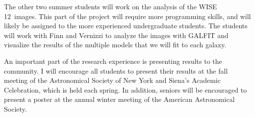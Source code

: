 \documentclass[11pt, preprint]{aastex}
\newcommand{\ha}{H$\alpha$}
\begin{document}
{The other two summer students will work on the analysis of the WISE
12\micron \ images.  This part of the project will require more
programming skills, and will likely be assigned to the more
experienced undergraduate students.  The students will work with Finn
and Vernizzi to analyze the images with GALFIT and visualize the
results of the multiple models that we will fit to each galaxy.



An important part of the research experience is presenting results
to the community. I will encourage all students 
to present their results at the fall meeting of the 
Astronomical Society of New York and Siena's Academic Celebration, which
is held each spring.  In addition, seniors will be encouraged to
present a poster at the 
annual winter meeting of the American Astronomical Society.  

}
\end{document}
